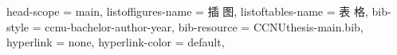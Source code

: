 {{      %
    head-scope = main,
    listoffigures-name = {插 \quad 图},
    listoftables-name  = {表 \quad 格},
    bib-style = ccnu-bachelor-author-year,
    bib-resource = {CCNUthesis-main.bib},
    hyperlink = none,
    hyperlink-color = default,
  }
}




